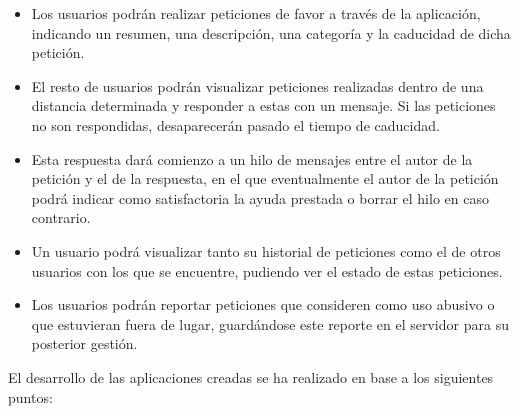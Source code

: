 \documentclass[main]{subfiles}
\begin{document}
\begin{itemize}
  \item Los usuarios podrán realizar peticiones de favor a través de la aplicación, indicando un resumen, una descripción, una categoría y la caducidad de dicha petición.
  \item El resto de usuarios podrán visualizar peticiones realizadas dentro de una distancia determinada y responder a estas con un mensaje. Si las peticiones no son respondidas, desaparecerán pasado el tiempo de caducidad.
  \item Esta respuesta dará comienzo a un hilo de mensajes entre el autor de la petición y el de la respuesta, en el que eventualmente el autor de la petición podrá indicar como satisfactoria la ayuda prestada o borrar el hilo en caso contrario.
  \item Un usuario podrá visualizar tanto su historial de peticiones como el de otros usuarios con los que se encuentre, pudiendo ver el estado de estas peticiones.
  \item Los usuarios podrán reportar peticiones que consideren como uso abusivo o que estuvieran fuera de lugar, guardándose este reporte en el servidor para su posterior gestión.
\end{itemize}

El desarrollo de las aplicaciones creadas se ha realizado en base a los siguientes puntos:
\end{document}
